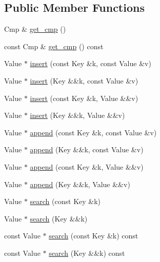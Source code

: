 \subsection*{Public Member Functions}
\begin{DoxyCompactItemize}
\item 
Cmp \& \hyperlink{class_designar_1_1_gen_map_a33a00f9275b3ff7788bbd93c39c25c9f}{get\+\_\+cmp} ()
\item 
const Cmp \& \hyperlink{class_designar_1_1_gen_map_a81de02316324ed11c8a668fe2d35d2d3}{get\+\_\+cmp} () const
\item 
Value $\ast$ \hyperlink{class_designar_1_1_gen_map_aaecc59b3f9c206d0d962bd1cd6bfc4d6}{insert} (const Key \&k, const Value \&v)
\item 
Value $\ast$ \hyperlink{class_designar_1_1_gen_map_aabd1f531f63985a2eabbeea49d90156e}{insert} (Key \&\&k, const Value \&v)
\item 
Value $\ast$ \hyperlink{class_designar_1_1_gen_map_a8fc2565be30a92687eea7f752b289751}{insert} (const Key \&k, Value \&\&v)
\item 
Value $\ast$ \hyperlink{class_designar_1_1_gen_map_a514311c4192292ff816931e0c42f929f}{insert} (Key \&\&k, Value \&\&v)
\item 
Value $\ast$ \hyperlink{class_designar_1_1_gen_map_ad5e2c8b57f6264ab98eec3a93e85b1a1}{append} (const Key \&k, const Value \&v)
\item 
Value $\ast$ \hyperlink{class_designar_1_1_gen_map_aeee7a9267c7c54044e7dca399658d9a7}{append} (Key \&\&k, const Value \&v)
\item 
Value $\ast$ \hyperlink{class_designar_1_1_gen_map_a2c148d9d32bc86315444f1026d9ef482}{append} (const Key \&k, Value \&\&v)
\item 
Value $\ast$ \hyperlink{class_designar_1_1_gen_map_a3bb1fd57e4ff94c0e585b41a359d0c52}{append} (Key \&\&k, Value \&\&v)
\item 
Value $\ast$ \hyperlink{class_designar_1_1_gen_map_a6a0eb4fe87d7bcc739f6394d5fd8952e}{search} (const Key \&k)
\item 
Value $\ast$ \hyperlink{class_designar_1_1_gen_map_a1c3b2c788cc8c1a7b59e5afb66fffca4}{search} (Key \&\&k)
\item 
const Value $\ast$ \hyperlink{class_designar_1_1_gen_map_a39037bc9d24b92fdcc7a6289db00e59b}{search} (const Key \&k) const
\item 
const Value $\ast$ \hyperlink{class_designar_1_1_gen_map_a00517c31638c479dca955b9204a2275e}{search} (Key \&\&k) const
\item 

\end{DoxyCompactItemize}
